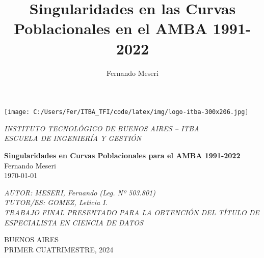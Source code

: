\documentclass{article}
\title{Singularidades en las Curvas Poblacionales en el AMBA 1991-2022}
\author{Fernando Meseri}
\theoremstyle{mytheoremstyle}
\theoremstyle{mytheoremstyle}
\theoremstyle{myproblemstyle}
\begin{document}
\begin{titlepage}
  \begin{flushright}
    \texttt{[image: C:/Users/Fer/ITBA\_TFI/code/latex/img/logo-itba-300x206.jpg]} %
  \end{flushright}
  \begin{flushleft}
    \large \textit{INSTITUTO TECNOLÓGICO DE BUENOS AIRES – ITBA}\\
    \vspace{0.5cm}
    \large \textit{ESCUELA DE INGENIERÍA Y GESTIÓN }\\
    \vspace{1cm}
  \end{flushleft}
\centering
{\Huge \textbf{Singularidades en Curvas Poblacionales para el AMBA 1991-2022}\\[1em]
 \Large Fernando Meseri\\[1em]
 \today}
\vfill
\begin{flushleft}
    \large \textit{AUTOR: MESERI, Fernando (Leg. Nº 503.801)}\\
    \vspace{1cm}
    \large \textit{TUTOR/ES: GOMEZ, Leticia I.}\\
    \vspace{1cm}
    \large \textit{TRABAJO FINAL PRESENTADO PARA LA OBTENCIÓN DEL TÍTULO DE ESPECIALISTA EN CIENCIA DE DATOS}
\end{flushleft}
\centering
 \Large BUENOS AIRES\\[1em]
 \Large PRIMER CUATRIMESTRE, 2024\\[1em]
\end{titlepage}





\newpage
\setcounter{page}{1}
\end{document}
